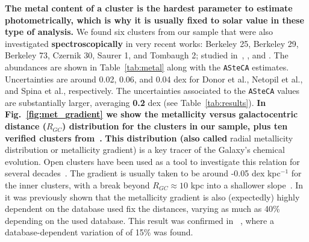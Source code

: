 \documentclass[referee]{aa}
\begin{document}
  \textbf{The metal content of a cluster is the hardest parameter to estimate
  photometrically, which is why it is usually fixed to solar value in these
  type of analysis.}
  We found six clusters from our sample that were also investigated
  \textbf{spectroscopically} in very recent works: Berkeley 25, Berkeley 29,
  Berkeley 73, Czernik 30, Saurer 1, and Tombaugh 2; studied
  in~\cite{Donor_2020}, \cite{Netopil_2021}, and \cite{Spina_2021}. The
  abundances are shown in Table~\ref{tab:metal} along with the \texttt{ASteCA}
  estimates. Uncertainties are around 0.02, 0.06, and 0.04 dex for Donor et
  al., Netopil et al., and Spina et al., respectively.
  The uncertainties associated to the \texttt{ASteCA} values are substantially
  larger, averaging \textbf{0.2} dex (see Table~\ref{tab:results}).
  \textbf{In Fig.~\ref{fig:met_gradient} we show the metallicity versus
  galactocentric distance ($R_{GC}$) distribution for the clusters in our
  sample, plus ten verified clusters from~\cite{Perren_2020}.}
  \textbf{This distribution (also called} radial metallicity distribution or
  metallicity gradient) is a key tracer of the Galaxy's chemical evolution.
  Open clusters have been used as a tool to investigate this relation for several
  decades~\citep{Janes_1979}. The gradient is usually taken to be around -0.05
  dex kpc$^{-1}$ for the inner clusters, with a break beyond $R_{GC}\approx10$
  kpc into a shallower slope~\citep{Donor_2020}. In~\cite{Donor_2018} it was
  previously shown that the metallicity gradient is also (expectedly) highly
  dependent on the database used fix the distances, varying as much as 40\%
  depending on the used database. This result was confirmed in~
  \cite{Donor_2020}, where a database-dependent variation of of 15\% was found.

\end{document}
